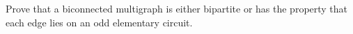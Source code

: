 Prove that a biconnected multigraph is either bipartite or has the property that each edge lies on an odd elementary circuit.